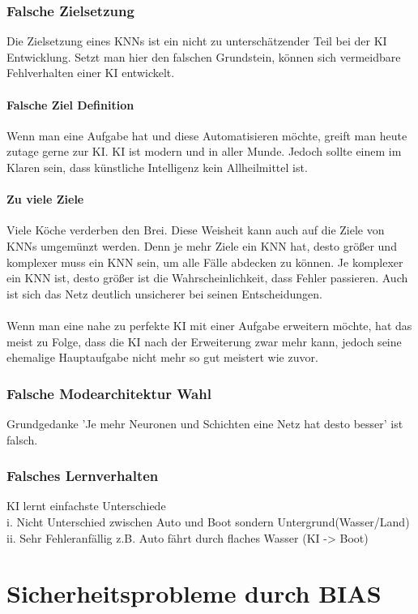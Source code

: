 \documentclass[12pt,oneside,a4paper,parskip]{scrbook}
\begin{document}
\subsection{Falsche Zielsetzung}
Die Zielsetzung eines KNNs ist ein nicht zu unterschätzender Teil bei der KI Entwicklung. Setzt man hier den falschen Grundstein, können sich vermeidbare Fehlverhalten einer KI entwickelt.
\subsubsection{Falsche Ziel Definition}
Wenn man eine Aufgabe hat und diese Automatisieren möchte, greift man heute zutage gerne zur KI. KI ist modern und in aller Munde. Jedoch sollte einem im Klaren sein, dass künstliche Intelligenz kein Allheilmittel ist.
\subsubsection{Zu viele Ziele}
Viele Köche verderben den Brei. Diese Weisheit kann auch auf die Ziele von KNNs umgemünzt werden. Denn je mehr Ziele ein KNN hat, desto größer und komplexer muss ein KNN sein, um alle Fälle abdecken zu können. Je komplexer ein KNN ist, desto größer ist die Wahrscheinlichkeit, dass Fehler passieren. Auch ist sich das Netz deutlich unsicherer bei seinen Entscheidungen.
\\\\ %
Wenn man eine nahe zu perfekte KI mit einer Aufgabe erweitern möchte, hat das meist zu Folge, dass die KI nach der Erweiterung zwar mehr kann, jedoch seine ehemalige Hauptaufgabe nicht mehr so gut meistert wie zuvor.
\subsection{Falsche Modearchitektur Wahl}
Grundgedanke 'Je mehr Neuronen und Schichten eine Netz hat desto besser' ist falsch.
\subsection{Falsches Lernverhalten}
KI lernt einfachste Unterschiede
\\i.	Nicht Unterschied zwischen Auto und Boot sondern Untergrund(Wasser/Land)
\\ii.	Sehr Fehleranfällig z.B. Auto fährt durch flaches Wasser (KI -> Boot)
\chapter{Sicherheitsprobleme durch BIAS}
\end{document}
